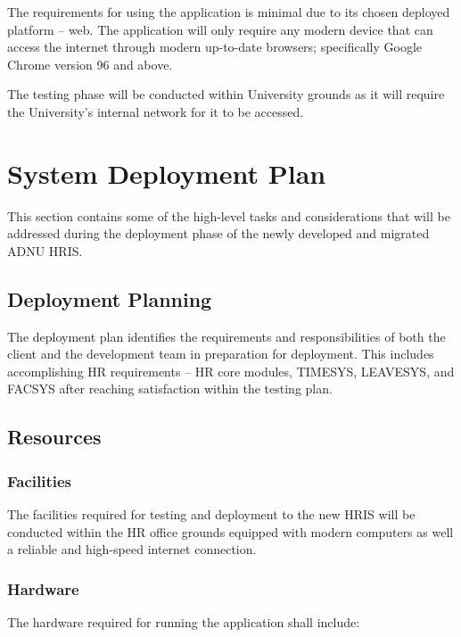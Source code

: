     The requirements for using the application is minimal due to its chosen deployed platform -- web. The application will only require any modern device that can access the internet through modern up-to-date browsers; specifically Google Chrome version 96 and above. 
    
    The testing phase will be conducted within University grounds as it will require the University's internal network for it to be accessed. 

\section{System Deployment Plan}

This section contains some of the high-level tasks and considerations that will be addressed during the deployment phase of the newly developed and migrated ADNU HRIS.

    \subsection{Deployment Planning}
        
        The deployment plan identifies the requirements and responsibilities of both the client and the development team in preparation for deployment. This includes accomplishing HR requirements -- HR core modules, TIMESYS, LEAVESYS, and FACSYS after reaching satisfaction within the testing plan.

    \subsection{Resources}
        \subsubsection{Facilities}

        The facilities required for testing and deployment to the new HRIS will be conducted within the HR office grounds equipped with modern computers as well a reliable and high-speed internet connection.

        \subsubsection{Hardware}

        The hardware required for running the application shall include:

